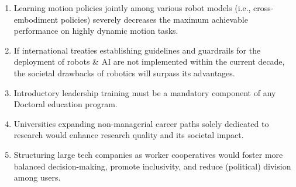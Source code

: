 \documentclass{propositions}
\begin{document}
\begin{enumerate}
    \item Learning motion policies jointly among various robot models (i.e., cross-embodiment policies) severely decreases the maximum achievable performance on highly dynamic motion tasks.
    \item If international treaties establishing guidelines and guardrails for the deployment of robots \& AI are not implemented within the current decade, the societal drawbacks of robotics will surpass its advantages.
    \item Introductory leadership training must be a mandatory component of any Doctoral education program. %
    \item Universities expanding non-managerial career paths solely dedicated to research would enhance research quality and its societal impact.
    \item Structuring large tech companies as worker cooperatives would foster more balanced decision-making, promote inclusivity, and reduce (political) division among users.
\end{enumerate}
\end{document}

